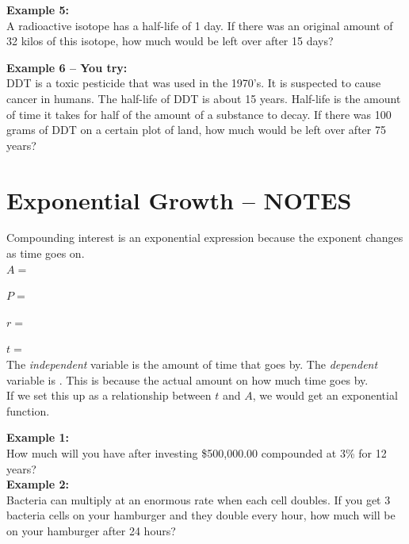\documentclass[12pt]{article}
\begin{document}
\vspace{1in}

\textbf{Example 5:}\\
A radioactive isotope has a half-life of 1 day. If there was an original amount of 32 kilos of this isotope, how much would be left over after 15 days?\\

\vspace{1in}

\textbf{Example 6 -- You try:}\\
DDT is a toxic pesticide that was used in the 1970's. It is suspected to cause cancer in humans.  The half-life of DDT is about 15 years.  Half-life is the amount of time it takes for half of the amount of a substance to decay. If there was 100 grams of DDT on a certain plot of land, how much would be left over after 75 years?

\section{Exponential Growth -- NOTES}

Compounding interest is an exponential expression because the exponent changes as time goes on. \\


$A=$ 

$P=$ 

$r=$ 

$t=$ \\

The \textit{independent} variable is \underline{\hspace{1cm}} the amount of time that goes by. The \textit{dependent} variable is \underline{\hspace{1cm}}. This is because the actual amount \underline{\hspace{1cm}} on how much time goes by.\\ If we set this up as a relationship between $t$ and $A$, we would get an exponential function.

\hrulefill

\textbf{Example 1:}\\
How much will you have after investing \$500,000.00 compounded at 3\% for 12 years?\\


\vspace{1in}
\textbf{Example 2:}\\
Bacteria can multiply at an enormous rate when each cell doubles. If you get 3 bacteria cells on your hamburger and they double every hour, how much will be on your hamburger after 24 hours?\\
\end{document}
